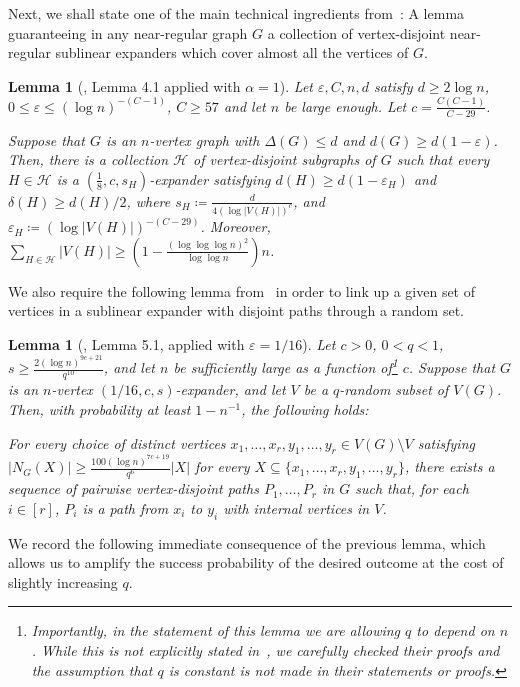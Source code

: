\documentclass[11pt,reqno]{article}
\newtheorem{lemma}[theorem]{Lemma}
\begin{document}
Next, we shall state one of the main technical ingredients from~\cite{expanders}: A lemma guaranteeing in any near-regular graph $G$ a collection of vertex-disjoint near-regular sublinear expanders which cover almost all the vertices of $G$.
\begin{lemma}[\cite{expanders}, Lemma 4.1 applied with $\alpha =1$]\label{lem: exapnder decomposition}
    Let $\varepsilon, C, n, d$ satisfy $d \ge 2 \log n$, $0 \le \varepsilon \le (\log n)^{-(C-1)}$, $C \ge 57$ and let $n$ be large enough. Let $c = \frac{C(C-1)}{C-29}$. 

	Suppose that $G$ is an $n$-vertex graph with $\Delta(G) \le d$ and $d(G) \ge d(1- \varepsilon)$. Then, there is a collection $\mathcal{H}$ of vertex-disjoint subgraphs of $G$ such that every $H \in \mathcal{H}$ is a $(\frac{1}{8}, c, s_H)$-expander satisfying $d(H) \ge d(1 - \varepsilon_H)$ and $\delta(H) \ge d(H)/2$, where $s_H \coloneqq \frac{d}{4 (\log |V(H)|)^c}$, and $\varepsilon_H \coloneqq (\log |V(H)|)^{-(C-29)}$. Moreover, $\sum_{H \in \mathcal{H}} |V(H)| \ge (1 - \frac{(\log \log \log n)^2}{\log \log n})n$. 
\end{lemma}
We also require the following lemma from~\cite{expanders} in order to link up a given set of vertices in a sublinear expander with disjoint paths through a random set. 
\begin{lemma}[\cite{expanders}, Lemma 5.1, applied with $\varepsilon=1/16$]\label{lem: expander paths}
Let $c > 0$, $0 < q < 1$, $s \ge \frac{2 (\log n)^{9c+21}}{q^{10}}$, and let $n$ be sufficiently large as a function of\footnote{Importantly, in the statement of this lemma we are allowing $q$ to depend on $n$. While this is not explicitly stated in~\cite{expanders}, we carefully checked their proofs and the assumption that $q$ is constant is not made in their statements or proofs.} $c$. Suppose that $G$ is an $n$-vertex $(1/16, c, s)$-expander, and let $V$ be a $q$-random subset of $V(G)$. Then, with probability at least $1 - n^{-1}$, the following holds:

For every choice of distinct vertices $x_1, \ldots, x_r, y_1, \ldots, y_r \in V(G)\setminus V$ satisfying $|N_G(X)| \ge \frac{100 (\log n)^{7c+19}}{q^6}|X|$ for every $X \subseteq \{x_1, \ldots, x_r, y_1, \ldots, y_r\}$, there exists a sequence of pairwise vertex-disjoint paths $P_1, \ldots, P_r$ in $G$ such that, for each $i \in [r]$, $P_i$ is a path from $x_i$ to $y_i$ with internal vertices in $V$.
\end{lemma}
We record the following immediate consequence of the previous lemma, which allows us to amplify the success probability of the desired outcome at the cost of slightly increasing $q$.
\end{document}
